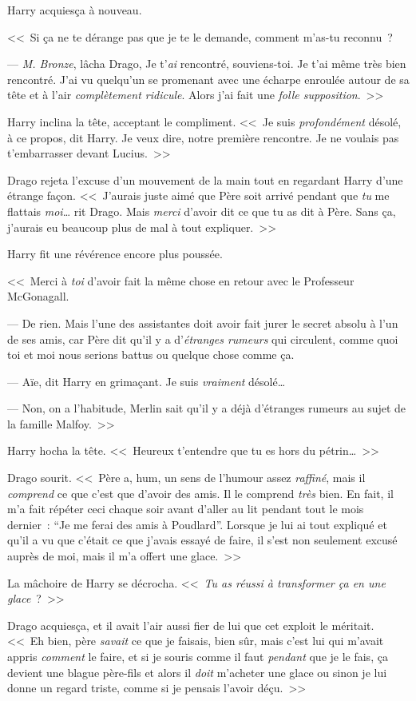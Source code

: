 Harry acquiesça à nouveau.

<<~Si ça ne te dérange pas que je te le demande, comment m'as-tu reconnu~?

--- \emph{M. Bronze}, lâcha Drago, Je t'\emph{ai} rencontré, souviens-toi. Je t'ai même très bien rencontré. J'ai vu quelqu'un se promenant avec une écharpe enroulée autour de sa tête et à l'air \emph{complètement ridicule}. Alors j'ai fait une \emph{folle supposition}.~>>

Harry inclina la tête, acceptant le compliment. <<~Je suis \emph{profondément} désolé, à ce propos, dit Harry. Je veux dire, notre première rencontre. Je ne voulais pas t'embarrasser devant Lucius.~>>

Drago rejeta l'excuse d'un mouvement de la main tout en regardant Harry d'une étrange façon. <<~J'aurais juste aimé que Père soit arrivé pendant que \emph{tu} me flattais \emph{moi}… rit Drago. Mais \emph{merci} d'avoir dit ce que tu as dit à Père. Sans ça, j'aurais eu beaucoup plus de mal à tout expliquer.~>>

Harry fit une révérence encore plus poussée.

<<~Merci à \emph{toi} d'avoir fait la même chose en retour avec le Professeur McGonagall.

--- De rien. Mais l'une des assistantes doit avoir fait jurer le secret absolu à l'un de ses amis, car Père dit qu'il y a d'\emph{étranges rumeurs} qui circulent, comme quoi toi et moi nous serions battus ou quelque chose comme ça.

--- Aïe, dit Harry en grimaçant. Je suis \emph{vraiment} désolé…

--- Non, on a l'habitude, Merlin sait qu'il y a déjà d'étranges rumeurs au sujet de la famille Malfoy.~>>

Harry hocha la tête. <<~Heureux t'entendre que tu es hors du pétrin…~>>

Drago sourit. <<~Père a, hum, un sens de l'humour assez \emph{raffiné}, mais il \emph{comprend} ce que c'est que d'avoir des amis. Il le comprend \emph{très} bien. En fait, il m'a fait répéter ceci chaque soir avant d'aller au lit pendant tout le mois dernier~: “Je me ferai des amis à Poudlard”. Lorsque je lui ai tout expliqué et qu'il a vu que c'était ce que j'avais essayé de faire, il s'est non seulement excusé auprès de moi, mais il m'a offert une glace.~>>

La mâchoire de Harry se décrocha. <<~\emph{Tu as réussi à transformer ça en une glace}~?~>>

Drago acquiesça, et il avait l'air aussi fier de lui que cet exploit le méritait. <<~Eh bien, père \emph{savait} ce que je faisais, bien sûr, mais c'est lui qui m'avait appris \emph{comment} le faire, et si je souris comme il faut \emph{pendant} que je le fais, ça devient une blague père-fils et alors il \emph{doit} m'acheter une glace ou sinon je lui donne un regard triste, comme si je pensais l'avoir déçu.~>>

